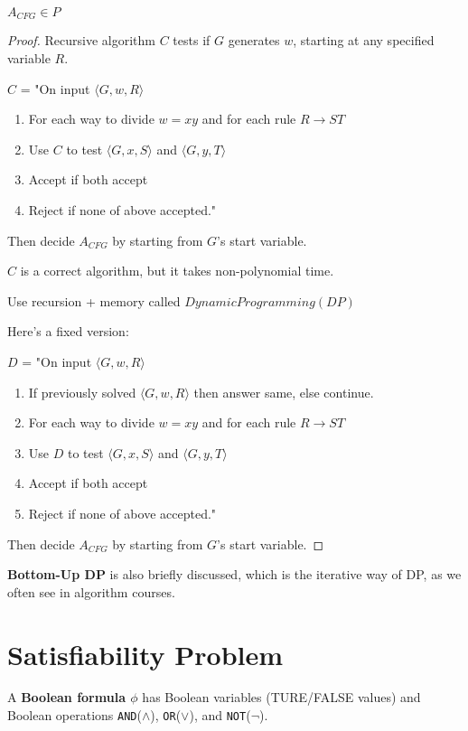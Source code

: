 \begin{theorem}
    \(A_{CFG} \in P\) 
\end{theorem}
\begin{proof}
    Recursive algorithm \(C\) tests if \(G\) generates \(w\), starting at any specified variable \(R\).    

    \(C\) = "On input \(\langle G, w, R \rangle\)
    \begin{enumerate}
        \item For each way to divide \(w = xy\) and for each rule \(R \rightarrow ST\)
        \item Use \(C\) to test \(\langle G, x, S \rangle\) and \(\langle G, y, T \rangle\) 
        \item Accept if both accept
        \item Reject if none of above accepted."    
    \end{enumerate}  
    Then decide \(A_{CFG}\) by starting from \(G\)'s start variable.  

    \(C\) is a correct algorithm, but it takes non-polynomial time. 

    \begin{remark}[Fix]
       Use recursion + memory called \(Dynamic Programming (DP)\)  
    \end{remark}

    Here's a fixed version:

    \(D\) = "On input \(\langle G, w, R \rangle\)
    \begin{enumerate}
        \item If previously solved \(\langle G, w, R \rangle\) then answer same, else continue. 
        \item For each way to divide \(w = xy\) and for each rule \(R \rightarrow ST\)
        \item Use \(D\) to test \(\langle G, x, S \rangle\) and \(\langle G, y, T \rangle\) 
        \item Accept if both accept
        \item Reject if none of above accepted."    
    \end{enumerate}  
    Then decide \(A_{CFG}\) by starting from \(G\)'s start variable.  
\end{proof}

\textbf{Bottom-Up DP} is also briefly discussed, which is the iterative way of DP, as we often see in algorithm courses.

\section{Satisfiability Problem}
\begin{definition}
    A \textbf{Boolean formula \(\phi\)}  has Boolean variables (TURE/FALSE values) and Boolean operations \verb|AND|(\(\land\)), \verb|OR|(\(\lor\)), and \verb|NOT|(\(\neg\)).
\end{definition}

